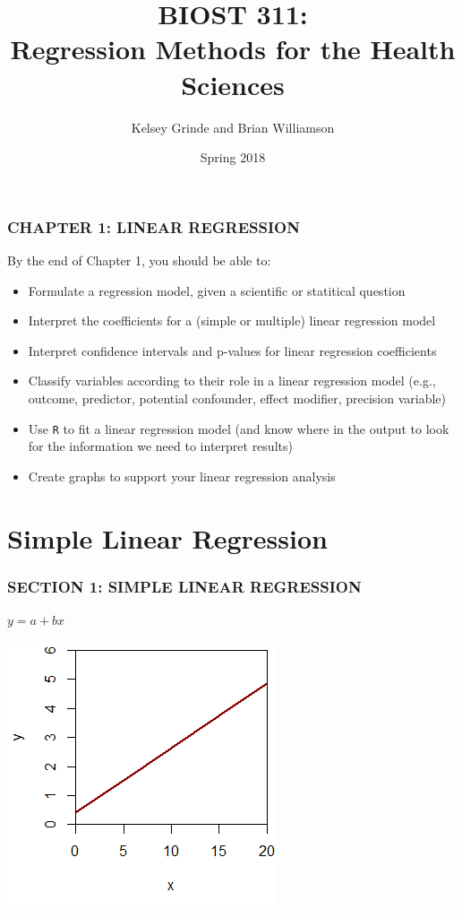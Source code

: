 \documentclass[12pt, 
hyperref={colorlinks=true, linkcolor=blue, urlcolor=cyan}]{beamer}
\title{BIOST 311: \\ Regression Methods for the Health Sciences}
\author{Kelsey Grinde and Brian Williamson}
\institute{UW Biostatistics}
\date{Spring 2018}
\begin{document}
\begin{frame}
\titlepage\thispagestyle{empty}
\end{frame}

  
\setcounter{framenumber}{\value{chap1}}

\begin{frame}
\frametitle{CHAPTER 1: LINEAR REGRESSION}
By the end of Chapter 1, you should be able to: \vspace{-0.3cm}

\begin{itemize}
\item Formulate a regression model, given a scientific or statitical question
\item Interpret the coefficients for a (simple or multiple) linear regression model
\item Interpret confidence intervals and p-values for linear regression coefficients
\item Classify variables according to their role in a linear regression model (e.g., outcome, predictor, potential confounder, effect modifier, precision variable)
\item Use \texttt{R} to fit a linear regression model (and know where in the output to look for the information we need to interpret results)
\item Create graphs to support your linear regression analysis
\end{itemize}

\end{frame}

\section{Simple Linear Regression}
\begin{frame}
\frametitle{SECTION 1: SIMPLE LINEAR REGRESSION}

\center 
\color{red} \begin{large} $y = a + bx$ \end{large} 

\vspace{-0.2cm} \includegraphics{./plots/plot_y_vs_x}

\end{frame}
\end{document}
